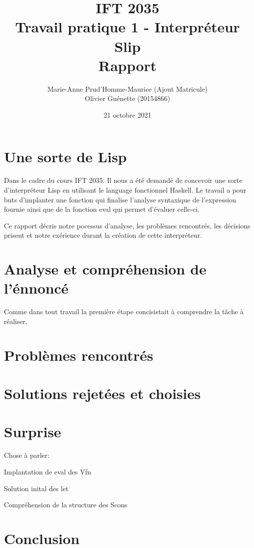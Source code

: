 \documentclass[12pt, letterpaper]{article}
\title{IFT 2035 \\ Travail pratique 1 - Interpréteur Slip \\ Rapport }
\author{ Marie-Anne Prud'Homme-Maurice (Ajout Matricule) 
\\ Olivier Guénette (20154866)}
\date{21 octobre 2021}
\begin{document}
\maketitle

\section*{Une sorte de Lisp}

Dans le cadre du cours IFT 2035. Il nous a été demandé de concevoir une sorte 
d'interpréteur Lisp en utilisant le language fonctionnel Haskell. Le travail 
a pour buts d'implanter une fonction qui finalise l'analyse syntaxique de 
l'expression fournie ainsi que de la fonction eval qui permet d'évaluer 
celle-ci.

Ce rapport décris notre pocessus d'analyse, les problèmes rencontrés, 
les décisions prisent et notre exérience durant la création de 
cette interpréteur.

\section*{Analyse et compréhension de l'énnoncé}

Comme dans tout travail la première étape concisistait à comprendre la tâche à 
réaliser.  

\section*{Problèmes rencontrés}

\section*{Solutions rejetées et choisies}

\section*{Surprise}

Chose à parler:

Implantation de eval des Vfn

Solution inital des let

Compréhension de la structure des Scons

\section*{Conclusion}
\end{document}
